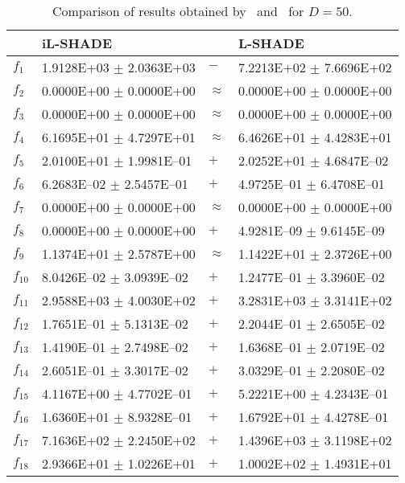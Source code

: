 \begin{table}[ht]
\centering
\caption{Comparison of results obtained by {\sf \ilshade}\ and {\sf \LSHADE}\ for $D=50$.} 
\label{tab:D50}
\begin{tabular}{|l|ll|l|}
  \hline
 & iL-SHADE &  & L-SHADE \\ 
  \hline \hline
$f_{1}$ & 1.9128E+03 $\pm$ 2.0363E+03 & $-$ & 7.2213E+02 $\pm$ 7.6696E+02 \\ 
  $f_{2}$ & 0.0000E+00 $\pm$ 0.0000E+00 & $\approx$ & 0.0000E+00 $\pm$ 0.0000E+00 \\ 
  $f_{3}$ & 0.0000E+00 $\pm$ 0.0000E+00 & $\approx$ & 0.0000E+00 $\pm$ 0.0000E+00 \\ 
  $f_{4}$ & 6.1695E+01 $\pm$ 4.7297E+01 & $\approx$ & 6.4626E+01 $\pm$ 4.4283E+01 \\ 
  $f_{5}$ & 2.0100E+01 $\pm$ 1.9981E--01 & $+$ & 2.0252E+01 $\pm$ 4.6847E--02 \\ 
  $f_{6}$ & 6.2683E--02 $\pm$ 2.5457E--01 & $+$ & 4.9725E--01 $\pm$ 6.4708E--01 \\ 
  $f_{7}$ & 0.0000E+00 $\pm$ 0.0000E+00 & $\approx$ & 0.0000E+00 $\pm$ 0.0000E+00 \\ 
  $f_{8}$ & 0.0000E+00 $\pm$ 0.0000E+00 & $+$ & 4.9281E--09 $\pm$ 9.6145E--09 \\ 
  $f_{9}$ & 1.1374E+01 $\pm$ 2.5787E+00 & $\approx$ & 1.1422E+01 $\pm$ 2.3726E+00 \\ 
  $f_{10}$ & 8.0426E--02 $\pm$ 3.0939E--02 & $+$ & 1.2477E--01 $\pm$ 3.3960E--02 \\ 
  $f_{11}$ & 2.9588E+03 $\pm$ 4.0030E+02 & $+$ & 3.2831E+03 $\pm$ 3.3141E+02 \\ 
  $f_{12}$ & 1.7651E--01 $\pm$ 5.1313E--02 & $+$ & 2.2044E--01 $\pm$ 2.6505E--02 \\ 
  $f_{13}$ & 1.4190E--01 $\pm$ 2.7498E--02 & $+$ & 1.6368E--01 $\pm$ 2.0719E--02 \\ 
  $f_{14}$ & 2.6051E--01 $\pm$ 3.3017E--02 & $+$ & 3.0329E--01 $\pm$ 2.2080E--02 \\ 
  $f_{15}$ & 4.1167E+00 $\pm$ 4.7702E--01 & $+$ & 5.2221E+00 $\pm$ 4.2343E--01 \\ 
  $f_{16}$ & 1.6360E+01 $\pm$ 8.9328E--01 & $+$ & 1.6792E+01 $\pm$ 4.4278E--01 \\ 
  $f_{17}$ & 7.1636E+02 $\pm$ 2.2450E+02 & $+$ & 1.4396E+03 $\pm$ 3.1198E+02 \\ 
  $f_{18}$ & 2.9366E+01 $\pm$ 1.0226E+01 & $+$ & 1.0002E+02 $\pm$ 1.4931E+01 \\ 

\end{tabular}
\end{table}
